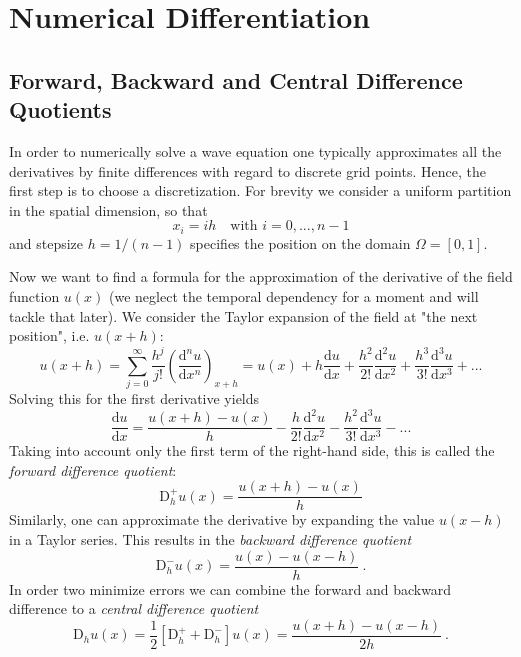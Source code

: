 \section{Numerical Differentiation}
\subsection{Forward, Backward and Central Difference Quotients}
In order to numerically solve a wave equation one typically approximates all the derivatives by finite differences with regard to discrete grid points.
Hence, the first step is to choose a discretization. For brevity we consider a uniform partition in the spatial dimension, so that
\[
x_i = i h  \quad \text{with } i = 0,...,n-1
\]
and stepsize $h = 1/(n-1)$ specifies the position on the domain $\Omega = [0,1] $.

Now we want to find a formula for the approximation of the derivative of the field function $u(x)$ (we neglect the temporal dependency for a moment and will tackle that later).
We consider the Taylor expansion of the field at "the next position", i.e. $u(x + h)$:
\begin{equation}
   u(x+h) = \sum_{j = 0}^{\infty} \frac{h^j}{j!} \left(\frac{\mathrm{d}^n u}{\mathrm{d} x^n} \right)_{x+h}
   = u(x) + h \frac{\mathrm{d} u}{\mathrm{d} x} + \frac{h^2}{2!} \frac{\mathrm{d}^2 u}{\mathrm{d} x^2} + \frac{h^3}{3!} \frac{\mathrm{d}^3 u}{\mathrm{d} x^3} + ...
   \label{eq:taylorfw}
 \end{equation}
Solving this for the first derivative yields
 \begin{equation}
   \frac{\mathrm{d} u}{\mathrm{d} x} = \frac{u(x+h) - u(x)}{h} - \frac{h}{2!} \frac{\mathrm{d}^2 u}{\mathrm{d} x^2} - \frac{h^2}{3!} \frac{\mathrm{d}^3 u}{\mathrm{d} x^3} - ...
 \end{equation}
Taking into account only the first term of the right-hand side, this is called the \emph{forward difference quotient}:
\begin{equation}
  \mathrm{D}^+_h u(x) = \frac{u(x+h) - u(x)}{h}
  \label{eq:discfw}
\end{equation}
Similarly, one can approximate the derivative by expanding the value $u(x-h)$ in a Taylor series. This results in the \emph{backward difference quotient}
\begin{equation}
  \mathrm{D}^-_h u(x) = \frac{u(x) - u(x-h)}{h}~.
\end{equation}
In order two minimize errors we can combine the forward and backward difference to a \emph{central difference quotient}
\begin{equation}
  \mathrm{D}_h u(x)= \frac{1}{2}[\mathrm{D}^+_h+ \mathrm{D}^-_h ] u(x)= \frac{u(x+h) - u(x-h)}{2h}~.
\end{equation}


